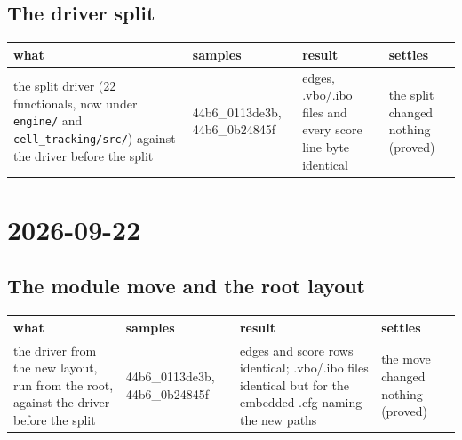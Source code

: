 \subsection{\texorpdfstring{The driver split}{The driver split}}

{\footnotesize
\setlength{\tabcolsep}{6pt}
\begin{longtable}{>{\RaggedRight\arraybackslash}p{}>{\RaggedRight\arraybackslash}p{}>{\RaggedRight\arraybackslash}p{}>{\RaggedRight\arraybackslash}p{}}
\toprule
what & samples & result & settles \\
\midrule
\endhead
the split driver (22 functionals, now under \texttt{engine/\allowbreak{}} and \texttt{cell\_\allowbreak{}tracking/\allowbreak{}src/\allowbreak{}}) against the driver before the split & 44b6\_\allowbreak{}0113de3b, 44b6\_\allowbreak{}0b24845f & edges, .vbo/.ibo files and every score line byte identical & the split changed nothing (proved) \\
\bottomrule
\end{longtable}
}

\section{\texorpdfstring{2026-09-22}{2026-09-22}}

\subsection{\texorpdfstring{The module move and the root layout}{The module move and the root layout}}

{\footnotesize
\setlength{\tabcolsep}{6pt}
\begin{longtable}{>{\RaggedRight\arraybackslash}p{}>{\RaggedRight\arraybackslash}p{}>{\RaggedRight\arraybackslash}p{}>{\RaggedRight\arraybackslash}p{}}
\toprule
what & samples & result & settles \\
\midrule
\endhead
the driver from the new layout, run from the root, against the driver before the split & 44b6\_\allowbreak{}0113de3b, 44b6\_\allowbreak{}0b24845f & edges and score rows identical; .vbo/.ibo files identical but for the embedded .cfg naming the new paths & the move changed nothing (proved) \\
\bottomrule
\end{longtable}
}

